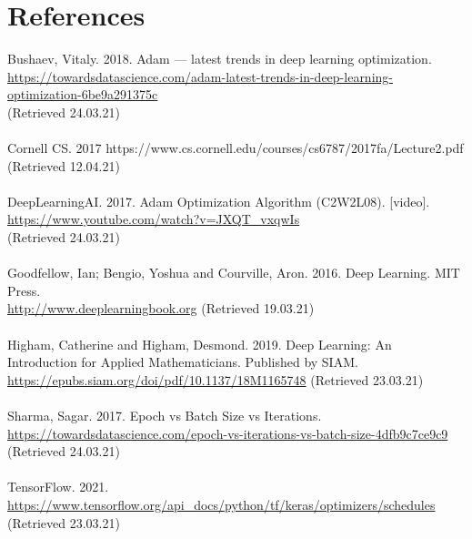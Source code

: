 \documentclass{article}
\begin{document}
\newpage
\section{References}

\noindent Bushaev, Vitaly. 2018. Adam — latest trends in deep learning optimization.\\
\url{https://towardsdatascience.com/adam-latest-trends-in-deep-learning-optimization-6be9a291375c}\\(Retrieved 24.03.21)\\\\

\noindent Cornell CS. 2017
https://www.cs.cornell.edu/courses/cs6787/2017fa/Lecture2.pdf\\(Retrieved 12.04.21)\\\\

\noindent DeepLearningAI. 2017. Adam Optimization Algorithm (C2W2L08). [video].\\ \url{https://www.youtube.com/watch?v=JXQT_vxqwIs}\\ (Retrieved 24.03.21)\\\\

\noindent Goodfellow, Ian; Bengio, Yoshua and Courville, Aron. 2016. Deep Learning. MIT Press.\\
\url{http://www.deeplearningbook.org} (Retrieved 19.03.21)\\\\


\noindent Higham, Catherine and Higham, Desmond. 2019. Deep Learning: An Introduction
for Applied Mathematicians. Published by SIAM.\\
\url{https://epubs.siam.org/doi/pdf/10.1137/18M1165748} (Retrieved 23.03.21)\\\\

\noindent Sharma, Sagar. 2017. Epoch vs Batch Size vs Iterations.\\ \url{https://towardsdatascience.com/epoch-vs-iterations-vs-batch-size-4dfb9c7ce9c9}\\(Retrieved 24.03.21)\\\\

\noindent TensorFlow. 2021.\\ \url{https://www.tensorflow.org/api_docs/python/tf/keras/optimizers/schedules}\\(Retrieved 23.03.21)\\\\
\end{document}
